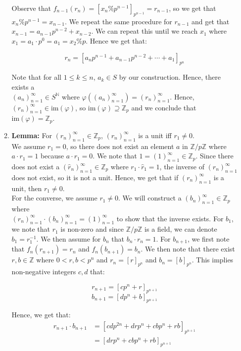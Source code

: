\documentclass{article}
\begin{document}
\begin{enumerate}
\begin{enumerate}
    Observe that $f_{n-1}(r_{n}) = [x_n \% p^{n-1}]_{p^{n-1}} = r_{n-1}$, so we get that $x_n \% p^{n-1} = x_{n-1}$. We repeat the same procedure for $r_{n-1}$ and get that $x_{n-1} = a_{n-1}p^{n-2} + x_{n-2}$. We can repeat this until we reach $x_1$ where $x_1 = a_1 \cdot p^0 = a_1 = x_2 \% p$. Hence we get that: 
    
    
    $$r_n = [a_n p^{n-1} + a_{n-1}p^{n-2}+ \cdots + a_1]_{p^{n}}$$

    Note that for all $1 \leq k \leq n$, $a_k \in S$ by our construction. Hence, there exists a \\
    $(a_n)^{\infty}_{n=1} \in S^{\mathbb{N}}$ where $\varphi((a_n)^{\infty}_{n=1}) = (r_n)^{\infty}_{n=1}$. Hence, $(r_n)^{\infty}_{n=1} \in \text{im}(\varphi)$, so $\text{im}(\varphi) \supseteq \mathbb{Z}_p$ and we conclude that $\text{im}(\varphi) = \mathbb{Z}_p$.\\

    \item 
    \textbf{Lemma:} For $(r_n)^{\infty}_{n=1} \in \mathbb{Z}_p$, $(r_n)^{\infty}_{n=1}$ is a unit iff $r_1 \neq 0$.\\

    We assume $r_1 = 0$, so there does not exist an element $a$ in $\mathbb{Z}/p\mathbb{Z}$ where $a \cdot r_1 = 1$ because $a \cdot r_1 = 0$. We note that $1 = (1)^{\infty}_{n=1}\in \mathbb{Z}_p$. Since there does not exist a $(\hat{r}_n)^{\infty}_{n=1} \in \mathbb{Z}_p$ where $r_1 \cdot \hat{r}_1 = 1$, the inverse of $(r_n)^{\infty}_{n=1}$ does not exist, so it is not a unit. Hence, we get that if $(r_n)^{\infty}_{n=1}$ is a unit, then $r_1 \neq 0$. \\

    For the converse, we assume $r_1 \neq 0$. We will construct a $(b_n)^{\infty}_{n=1} \in \mathbb{Z}_p$ where \\ $(r_n)^{\infty}_{n=1} \cdot (b_n)^{\infty}_{n=1} = (1)^{\infty}_{n=1}$ to show that the inverse exists. For $b_1$, we note that $r_1$ is non-zero and since $\mathbb{Z}/p\mathbb{Z}$ is a field, we can denote $b_1 = r_1^{-1}$. We then assume for $b_n$ that $b_n \cdot r_n = 1$. For $b_{n+1}$, we first note that $f_n(r_{n+1}) = r_n$ and $f_n(b_{n+1}) = b_n$. We then note that there exist $r, b \in \mathbb{Z}$ where $0 < r, b < p^n$ and $r_n = [r]_{p^n}$ and $b_n = [b]_{p^n}$. This implies non-negative integers $c, d$ that: 

    $$r_{n+1} = [cp^n + r]_{p^{n+1}}$$
    $$b_{n+1} = [dp^n + b]_{p^{n+1}}$$

    Hence, we get that:  
    \begin{align*}
        r_{n+1} \cdot b_{n+1} &= [cdp^{2n} + drp^n + cbp^n + rb]_{p^{n+1}} \\
        &=  [drp^n + cbp^n + rb]_{p^{n+1}} 
    \end{align*}


\end{enumerate}
\end{enumerate}
\end{document}
